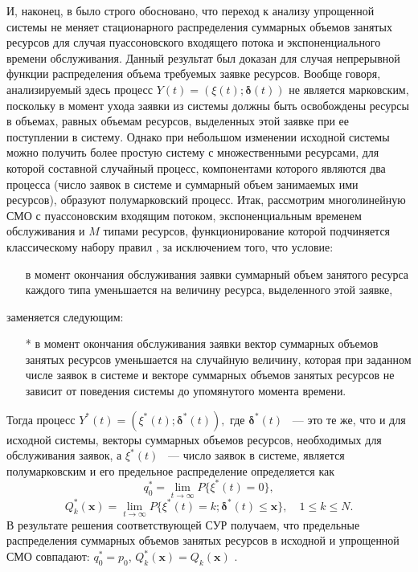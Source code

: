 \documentclass[a4paper,12pt]{article}
\begin{document}
И, наконец, в \cite{Naumov_3_2016} было строго обосновано, что переход к анализу упрощенной системы не меняет стационарного распределения суммарных объемов занятых ресурсов для случая пуассоновского входящего потока и экспоненциального времени обслуживания. Данный результат был доказан для случая непрерывной функции распределения объема требуемых заявке ресурсов.
Вообще говоря, анализируемый здесь процесс $Y(t)=(\xi(t);\boldsymbol{\delta}(t))$ не является марковским, поскольку в момент ухода заявки из системы должны быть освобождены ресурсы в объемах, равных объемам ресурсов, выделенных этой заявке при ее поступлении в систему. Однако при небольшом изменении исходной системы можно получить более простую систему с множественными ресурсами, для которой составной случайный процесс, компонентами которого являются два процесса (число заявок в системе и суммарный объем занимаемых ими ресурсов), образуют полумарковский процесс.
Итак, рассмотрим многолинейную СМО с пуассоновским входящим потоком, экспоненциальным временем обслуживания и $M$ типами ресурсов, функционирование которой подчиняется классическому набору правил \cite{Ch_1},
за исключением того, что условие:
\begin{enumerate}
\item[] в момент окончания обслуживания заявки суммарный объем занятого ресурса каждого типа уменьшается на величину ресурса, выделенного этой заявке,
\end{enumerate}
заменяется следующим:
\begin{enumerate}
\item[*] в момент окончания обслуживания заявки вектор суммарных объемов занятых ресурсов уменьшается на случайную величину, которая при заданном числе заявок в системе и векторе суммарных объемов занятых ресурсов не зависит от поведения системы до упомянутого момента времени.
\end{enumerate}

Тогда процесс $Y^*(t)=(\xi^*(t);\boldsymbol{\delta}^*(t)),$ где $\boldsymbol{\delta}^*(t)$ ~--- это те же,
что и для исходной системы, векторы суммарных объемов ресурсов, необходимых для
обслуживания заявок, а $\xi^*(t)$ ~--- число заявок в системе, является полумарковским и его предельное распределение определяется как
\begin{equation}
q_0^*=\lim_{t\rightarrow \infty}P\{\xi^*(t)=0\},
\end{equation}
\begin{equation}
Q_k^*(\mathbf{x})=\lim_{t\rightarrow \infty}P\{\xi^*(t)=k; \boldsymbol{\delta}^*(t) \leq \mathbf{x}\}, \quad 1\leq k\leq N.
\end{equation}
В результате решения соответствующей СУР получаем, что предельные распределения суммарных объемов занятых ресурсов в исходной и упрощенной СМО совпадают: $q_0^*=p_0$, $Q_k^*(\mathbf{x})=Q_k(\mathbf{x})$ \cite{Naumov_3_2016}.
\end{document}
